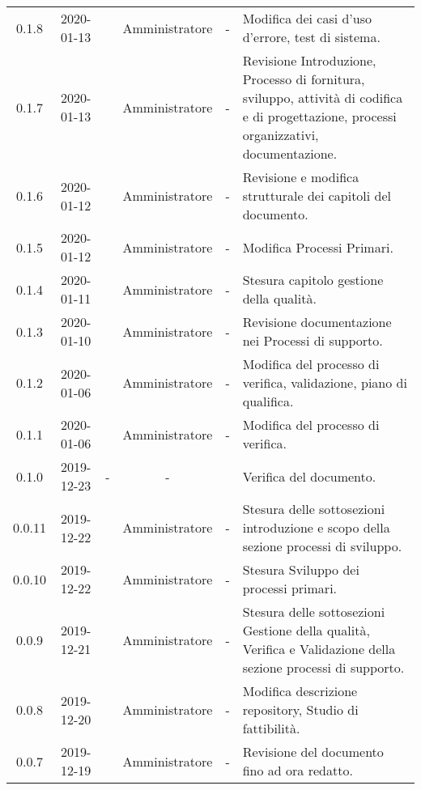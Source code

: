 {\begin{longtable}{ c c  C{2.5cm} c c C{3.5cm}}
0.1.8 & 2020-01-13 & \BR{} & Amministratore & - & Modifica dei casi d'uso d'errore, test di sistema. \\

0.1.7 & 2020-01-13 & \AT{} & Amministratore & - & Revisione Introduzione, Processo di fornitura, sviluppo, attività di codifica e di progettazione, processi organizzativi, documentazione. \\

0.1.6 & 2020-01-12 & \MC{} & Amministratore & - & Revisione e modifica strutturale dei capitoli del documento. \\

0.1.5 & 2020-01-12 & \AT{} & Amministratore & - & Modifica Processi Primari. \\

0.1.4 & 2020-01-11 & \MC{} & Amministratore & - & Stesura capitolo gestione della qualità. \\

0.1.3 & 2020-01-10 & \MC{} & Amministratore & - & Revisione documentazione nei Processi di supporto. \\

0.1.2 & 2020-01-06 & \AT{} & Amministratore & - & Modifica del processo di verifica, validazione, piano di qualifica. \\

0.1.1 & 2020-01-06 & \AT{} & Amministratore & - & Modifica del processo di verifica. \\

0.1.0 & 2019-12-23 & - & - & \CE{} & Verifica del documento. \\

0.0.11 & 2019-12-22 & \PF{} & Amministratore & - & Stesura delle sottosezioni introduzione e scopo della sezione processi di sviluppo. \\

0.0.10 & 2019-12-22 & \PF{} & Amministratore & - & Stesura Sviluppo dei processi primari. \\

0.0.9 & 2019-12-21 & \PF{} & Amministratore & - & Stesura delle sottosezioni Gestione della qualità, Verifica e Validazione della sezione processi di supporto. \\

0.0.8 & 2019-12-20 & \MC{} & Amministratore & - & Modifica descrizione repository, Studio di fattibilità. \\

0.0.7 & 2019-12-19 & \SE{} & Amministratore & - & Revisione del documento fino ad ora redatto. \\


\end{longtable}}
